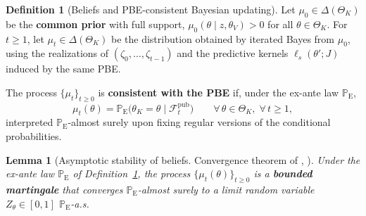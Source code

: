 \documentclass[ecta,nameyear,final,supplement]{econsocart}
\numberwithin{equation}{section}
\numberwithin{table}{section}
\newtheorem{lemma}[theorem]{Lemma}
\theoremstyle{definition}
\newtheorem{definition}[theorem]{Definition}
\newcommand{\ProbE}{\mathbb{P}_{\mathrm{E}}}
\begin{document}
\bigskip

\begin{definition}[Beliefs and PBE-consistent Bayesian updating]
\label{def:beliefs-martingale}
Let $\mu_0\in\Delta(\Theta_K)$ be the \textbf{common prior} with full support,
$\mu_0(\theta\mid z,\theta_V)>0$ for all $\theta\in\Theta_K$.
For $t\ge 1$, let $\mu_t\in\Delta(\Theta_K)$ be the distribution obtained by
iterated Bayes from $\mu_0$, using the realizations of
$(\zeta_0,\ldots,\zeta_{t-1})$ and the predictive kernels
$\ell_s(\theta';J)$ induced by the same PBE.

The process $\{\mu_t\}_{t\ge 0}$ is \textbf{consistent with the PBE} if, under
the ex-ante law $\ProbE$,
\begin{equation}
\label{eq:beliefs-ebp-consistency}
\mu_t(\theta)
=\ProbE\bigl(\theta_K=\theta\mid\mathcal{F}_t^{\mathrm{pub}}\bigr)
\qquad\forall\,\theta\in\Theta_K,\;\forall\,t\ge 1,
\end{equation}
interpreted $\ProbE$-almost surely upon fixing regular versions of the
conditional probabilities.
\end{definition}

\bigskip

\begin{lemma}[Asymptotic stability of beliefs. Convergence theorem of
\citeauthor{Doob1953Stochastic}, \citeyear{Doob1953Stochastic}]
\label{lem:asymptotic-beliefs}
Under the ex-ante law $\ProbE$ of
Definition~\ref{def:beliefs-martingale}, the process
$\{\mu_t(\theta)\}_{t\ge 0}$ is a \textbf{bounded martingale} that converges
$\ProbE$-almost surely to a limit random variable
$Z_\theta\in[0,1]$ $\ProbE$-a.s.
\end{lemma}
\end{document}
